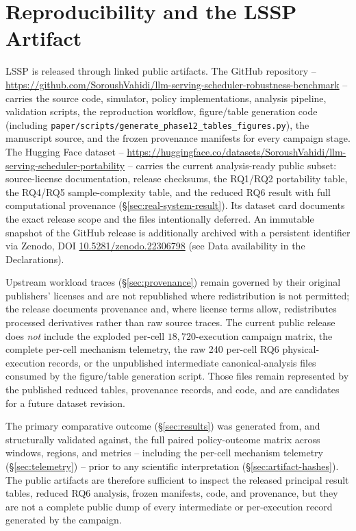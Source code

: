 \section{Reproducibility and the LSSP Artifact}
\label{sec:artifact}

LSSP is released through linked public artifacts. The GitHub
repository -- \url{https://github.com/SoroushVahidi/llm-serving-scheduler-robustness-benchmark}
-- carries the source code, simulator, policy implementations, analysis
pipeline, validation scripts, the reproduction workflow, figure/table
generation code (including
\texttt{paper/scripts/generate\_phase12\_tables\_figures.py}), the manuscript
source, and the frozen provenance manifests for every campaign stage. The Hugging
Face dataset -- \url{https://huggingface.co/datasets/SoroushVahidi/llm-serving-scheduler-portability}
-- carries the current analysis-ready public subset: source-license
documentation, release checksums, the RQ1/RQ2 portability table, the RQ4/RQ5
sample-complexity table, and the reduced RQ6 result with full computational
provenance (\S\ref{sec:real-system-result}). Its dataset card documents the
exact release scope and the files intentionally deferred. An immutable
snapshot of the GitHub release is
additionally archived with a persistent identifier via Zenodo, DOI
\href{https://doi.org/10.5281/zenodo.22306798}{10.5281/zenodo.22306798}
(see Data availability in the Declarations).

Upstream workload traces (\S\ref{sec:provenance}) remain governed by their
original publishers' licenses and are not republished where redistribution
is not permitted; the release documents provenance and, where license
terms allow, redistributes processed derivatives rather than raw source
traces. The current public release does \emph{not} include the exploded
per-cell $18{,}720$-execution campaign matrix, the complete per-cell
mechanism telemetry, the raw 240 per-cell RQ6 physical-execution records,
or the unpublished intermediate canonical-analysis files consumed by the
figure/table generation script. Those files remain represented by the
published reduced tables, provenance records, and code, and are candidates
for a future dataset revision.

The primary comparative outcome (\S\ref{sec:results}) was generated from,
and structurally validated against, the full paired policy-outcome matrix
across windows, regions, and metrics -- including the per-cell mechanism
telemetry (\S\ref{sec:telemetry}) -- prior to any scientific
interpretation (\S\ref{sec:artifact-hashes}). The public artifacts are
therefore sufficient to inspect the released principal result tables, reduced
RQ6 analysis, frozen manifests, code, and provenance, but they are not a
complete public dump of every intermediate or per-execution record generated
by the campaign.

